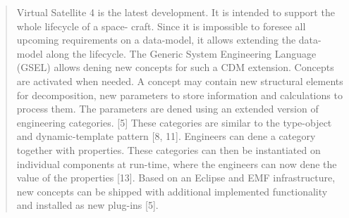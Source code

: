 \begin{quote}
Virtual Satellite 4 is the latest development. It is intended to support the whole lifecycle of a space-
craft. Since it is impossible to foresee all upcoming requirements on a data-model, it allows extending
the data-model along the lifecycle. The Generic System Engineering Language (GSEL) allows dening
new concepts for such a CDM extension. Concepts are activated when needed. A concept may contain
new structural elements for decomposition, new parameters to store information and calculations to
process them. The parameters are dened using an extended version of engineering categories. [5] These
categories are similar to the type-object and dynamic-template pattern [8, 11]. Engineers can dene a
category together with properties. These categories can then be instantiated on individual components
at run-time, where the engineers can now dene the value of the properties [13]. Based on an Eclipse
and EMF infrastructure, new concepts can be shipped with additional implemented functionality and
installed as new plug-ins [5].
\cite{review-1277}
\end{quote}

